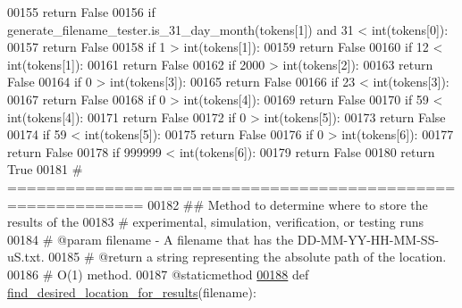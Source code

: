 \begin{DoxyCode}
00155             \textcolor{keywordflow}{return} \textcolor{keyword}{False}
00156         \textcolor{keywordflow}{if} generate\_filename\_tester.is\_31\_day\_month(tokens[1]) \textcolor{keywordflow}{and} 31 < int(tokens[0]):
00157             \textcolor{keywordflow}{return} \textcolor{keyword}{False}
00158         \textcolor{keywordflow}{if} 1 > int(tokens[1]):
00159             \textcolor{keywordflow}{return} \textcolor{keyword}{False}
00160         \textcolor{keywordflow}{if} 12 < int(tokens[1]):
00161             \textcolor{keywordflow}{return} \textcolor{keyword}{False}
00162         \textcolor{keywordflow}{if} 2000 > int(tokens[2]):
00163             \textcolor{keywordflow}{return} \textcolor{keyword}{False}
00164         \textcolor{keywordflow}{if} 0 > int(tokens[3]):
00165             \textcolor{keywordflow}{return} \textcolor{keyword}{False}
00166         \textcolor{keywordflow}{if} 23 < int(tokens[3]):
00167             \textcolor{keywordflow}{return} \textcolor{keyword}{False}
00168         \textcolor{keywordflow}{if} 0 > int(tokens[4]):
00169             \textcolor{keywordflow}{return} \textcolor{keyword}{False}
00170         \textcolor{keywordflow}{if} 59 < int(tokens[4]):
00171             \textcolor{keywordflow}{return} \textcolor{keyword}{False}
00172         \textcolor{keywordflow}{if} 0 > int(tokens[5]):
00173             \textcolor{keywordflow}{return} \textcolor{keyword}{False}
00174         \textcolor{keywordflow}{if} 59 < int(tokens[5]):
00175             \textcolor{keywordflow}{return} \textcolor{keyword}{False}
00176         \textcolor{keywordflow}{if} 0 > int(tokens[6]):
00177             \textcolor{keywordflow}{return} \textcolor{keyword}{False}
00178         \textcolor{keywordflow}{if} 999999 < int(tokens[6]):
00179             \textcolor{keywordflow}{return} \textcolor{keyword}{False}
00180         \textcolor{keywordflow}{return} \textcolor{keyword}{True}
00181     \textcolor{comment}{# ============================================================}
00182     \textcolor{comment}{##  Method to determine where to store the results of the}
00183     \textcolor{comment}{#       experimental, simulation, verification, or testing runs}
00184     \textcolor{comment}{#   @param filename - A filename that has the DD-MM-YY-HH-MM-SS-uS.txt.}
00185     \textcolor{comment}{#   @return a string representing the absolute path of the location.}
00186     \textcolor{comment}{#   O(1) method.}
00187     @staticmethod
\hypertarget{miscellaneous_8py_source_l00188}{}\hyperlink{classutilities_1_1miscellaneous_1_1misc_ab675e34a1a463f5a6aac272debe372ae}{00188}     \textcolor{keyword}{def }\hyperlink{classutilities_1_1miscellaneous_1_1misc_ab675e34a1a463f5a6aac272debe372ae}{find\_desired\_location\_for\_results}(filename):

\end{DoxyCode}
